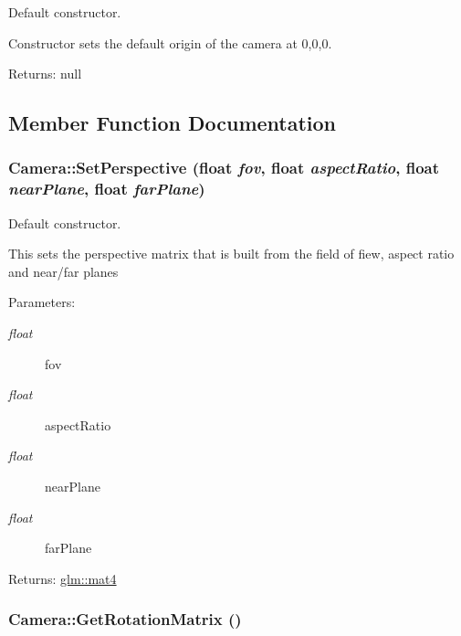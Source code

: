 Default constructor. 

Constructor sets the default origin of the camera at 0,0,0.

\begin{Desc}
\item[Returns:]null \end{Desc}


\subsection{Member Function Documentation}
\hypertarget{class_camera_621b0ca0ddcab43fb95ee754c443dfa4}{
\subsubsection[SetPerspective]{ Camera::SetPerspective (float {\em fov}, \/  float {\em aspectRatio}, \/  float {\em nearPlane}, \/  float {\em farPlane})}}
\label{class_camera_621b0ca0ddcab43fb95ee754c443dfa4}


Default constructor. 

This sets the perspective matrix that is built from the field of fiew, aspect ratio and near/far planes

\begin{Desc}
\item[Parameters:]
\begin{description}
\item[{\em float}]fov \item[{\em float}]aspectRatio \item[{\em float}]nearPlane \item[{\em float}]farPlane \end{description}
\end{Desc}
\begin{Desc}
\item[Returns:]\hyperlink{group__core__types_g7dcd2365c2e368e6af5b7adeb6a9c8df}{glm::mat4} \end{Desc}
\hypertarget{class_camera_3518233b244af839db6eefe59e7002de}{
\subsubsection[GetRotationMatrix]{ Camera::GetRotationMatrix ()}}
\label{class_camera_3518233b244af839db6eefe59e7002de}


